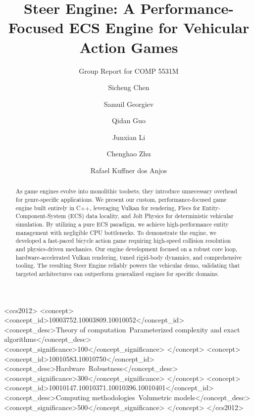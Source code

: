 \documentclass[acmtog, nonacm]{acmart}
\begin{document}
\title{Steer Engine: A Performance-Focused ECS Engine for Vehicular Action Games}
\subtitle{Group Report for COMP 5531M}

\author{Sicheng Chen}

\author{Samuil Georgiev}
\authornotemark[1]

\author{Qidan Guo}
\authornotemark[1]

\author{Junxian Li}
\authornotemark[1]

\author{Chenghao Zhu}
\authornotemark[1]

\author{Rafael Kuffner dos Anjos}


\begin{abstract}

  As game engines evolve into monolithic toolsets, they introduce unnecessary overhead for genre-specific applications. We present our custom, performance-focused game engine built entirely in C++, leveraging Vulkan for rendering, Flecs for Entity-Component-System (ECS) data locality, and Jolt Physics for deterministic vehicular simulation. By utilizing a pure ECS paradigm, we achieve high-performance entity management with negligible CPU bottlenecks. To demonstrate the engine, we developed a fast-paced bicycle action game requiring high-speed collision resolution and physics-driven mechanics. Our engine development focused on a robust core loop, hardware-accelerated Vulkan rendering, tuned rigid-body dynamics, and comprehensive tooling. The resulting Steer Engine reliably powers the vehicular demo, validating that targeted architectures can outperform generalized engines for specific domains.
\end{abstract}

\begin{CCSXML}
<ccs2012>
   <concept>
       <concept_id>10003752.10003809.10010052</concept_id>
       <concept_desc>Theory of computation~Parameterized complexity and exact algorithms</concept_desc>
       <concept_significance>100</concept_significance>
       </concept>
   <concept>
       <concept_id>10010583.10010750</concept_id>
       <concept_desc>Hardware~Robustness</concept_desc>
       <concept_significance>300</concept_significance>
       </concept>
   <concept>
       <concept_id>10010147.10010371.10010396.10010401</concept_id>
       <concept_desc>Computing methodologies~Volumetric models</concept_desc>
       <concept_significance>500</concept_significance>
       </concept>
 </ccs2012>
\end{CCSXML}
\end{document}
